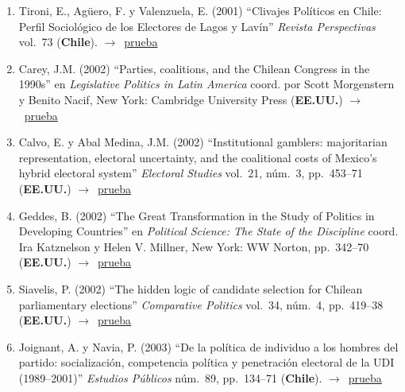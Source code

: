 \documentclass[12 pt, letter]{article}
\newenvironment{CitasMiTrabajo}{
    \begin{footnotesize}
    \begin{enumerate}[label={\footnotesize\emph{cita~\arabic*}},ref=\arabic*] %
        \setlength{\itemsep}{.1\itemsep}
        \setlength{\parskip}{.1\parskip}
    }{\end{enumerate}\end{footnotesize}}
\begin{document}
\begin{CitasMiTrabajo}
        \item Tironi, E., Ag\"uero, F. y Valenzuela, E. (2001)
        ``Clivajes Pol\'iticos en Chile: Perfil Sociol\'ogico de los Electores de Lagos y Lav\'in''
        \emph{Revista Perspectivas} vol.\ 73 (\textbf{Chile}). $\rightarrow$~\href{http://ericmagar.com/cv/cites/mrs/tironietal2001.pdf}{prueba}

        \item Carey, J.M. (2002)
        ``Parties, coalitions, and the Chilean Congress in the 1990s''
        en \emph{Legislative Politics in Latin America}
        coord. por Scott Morgenstern y Benito Nacif, New York: Cambridge
        University Press (\textbf{EE.UU.}) $\rightarrow$~\href{http://ericmagar.com/cv/cites/mrs/careyInMorgNacif.pdf}{prueba}

        \item Calvo, E. y Abal Medina, J.M. (2002)
        ``Institutional
        gamblers: majoritarian representation, electoral uncertainty, and the
        coalitional costs of Mexico's hybrid electoral system''
        \emph{Electoral Studies} vol.\ 21, n\'um.\ 3, pp.\ 453--71 (\textbf{EE.UU.}) $\rightarrow$~\href{http://ericmagar.com/cv/cites/mrs/calvoMedina.pdf}{prueba}

        \item Geddes, B. (2002)
        ``The Great Transformation in the
        Study of Politics in Developing Countries'' en \emph{Political Science: The
        State of the Discipline} coord. Ira Katznelson y Helen V. Millner,
        New York: WW Norton, pp.\ 342--70  (\textbf{EE.UU.}) $\rightarrow$~\href{http://ericmagar.com/cv/cites/mrs/geddesStateOfDisc.pdf}{prueba}

        \item Siavelis, P. (2002)
        ``The hidden logic of candidate selection
        for Chilean parliamentary elections'' \emph{Comparative Politics}
        vol.\ 34, n\'um.\ 4, pp.\ 419--38 (\textbf{EE.UU.}) $\rightarrow$~\href{http://ericmagar.com/cv/cites/mrs/siavels2002cp.pdf}{prueba}

        \item Joignant, A. y Navia, P. (2003)
        ``De la pol\'itica de individuo a los hombres del partido: socializaci\'on, competencia pol\'itica y penetraci\'on electoral
        de la UDI (1989--2001)'' \emph{Estudios P\'ublicos} n\'um.\ 89, pp.\ 134--71 (\textbf{Chile}). $\rightarrow$~\href{http://ericmagar.com/cv/cites/mrs/joigNavia.pdf}{prueba}


\end{CitasMiTrabajo}
\end{document}
